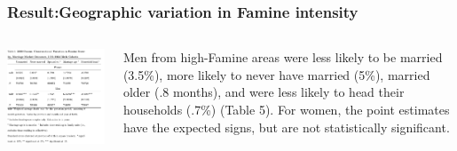 \documentclass{beamer}
\begin{document}
\begin{frame}
\frametitle{Result:Geographic variation in Famine intensity}
    \begin{columns}
            \begin{minipage}[c][0.4\textheight][c]{\linewidth}
                \centering
                \includegraphics[width=1\linewidth]{table5}
            \end{minipage}
           
            \begin{minipage}[c][0.4\textheight][c]{\linewidth}
            Men from high-Famine areas were less likely to be married (3.5\%), more likely to never have married (5\%), married older (.8 months), and were less likely to head their households (.7\%) (Table 5). For women, the point estimates have the expected signs, but are not statistically signiﬁcant.
            \end{minipage}
    \end{columns}
\end{frame}
\end{document}
